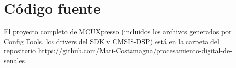 \documentclass[11pt,a4paper]{article}
\begin{document}
\clearpage
\appendix
\section{Código fuente}\label{sec:codigo}

El proyecto completo de MCUXpresso (incluidos los archivos generados por
Config Tools, los drivers del SDK y CMSIS-DSP) está en la carpeta
 del repositorio
\url{https://github.com/Mati-Costamagna/procesamiento-digital-de-senales}.
\end{document}
